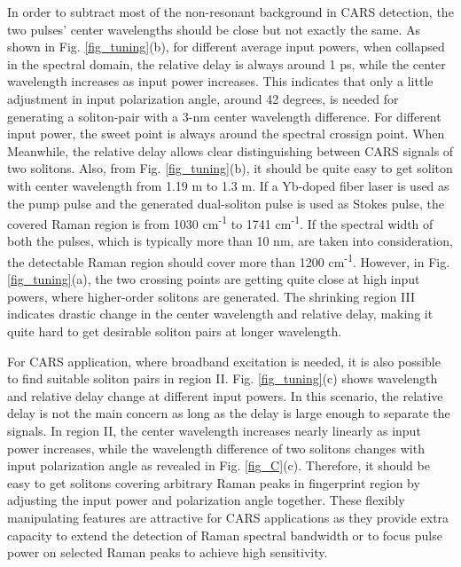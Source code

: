\documentclass{osa-article}
\begin{document}
In order to subtract most of the non-resonant background in CARS detection, the two pulses' center wavelengths should be close but not exactly the same\cite{rocha-mendoza_differential_2009}. As shown in Fig. \ref{fig_tuning}(b), for different average input powers, when collapsed in the spectral domain, the relative delay is always around 1 ps, while the center wavelength increases as input power increases. This indicates that only a little adjustment in input polarization angle, around 42 degrees, is needed for generating a soliton-pair with a 3-nm center wavelength difference. For different input power, the sweet point is always around the spectral crossign point. When Meanwhile, the relative delay allows clear distinguishing between CARS signals of two solitons. Also, from Fig. \ref{fig_tuning}(b), it should be quite easy to get soliton with center wavelength from 1.19 \textmu m to 1.3 \textmu m. If a Yb-doped fiber laser is used as the pump pulse and the generated dual-soliton pulse is used as Stokes pulse, the covered Raman region is from 1030 cm\textsuperscript{-1} to 1741 cm\textsuperscript{-1}. If the spectral width of both the pulses, which is typically more than 10 nm, are taken into consideration, the detectable Raman region should cover more than 1200 cm\textsuperscript{-1}. However, in Fig. \ref{fig_tuning}(a), the two crossing points are getting quite close at high input powers, where higher-order solitons are generated. The shrinking region III indicates drastic change in the center wavelength and relative delay, making it quite hard to get desirable soliton pairs at longer wavelength.

For CARS application, where broadband excitation is needed, it is also possible to find suitable soliton pairs in region II. Fig. \ref{fig_tuning}(c) shows wavelength and relative delay change at different input powers. In this scenario, the relative delay is not the main concern as long as the delay is large enough to separate the signals. In region II, the center wavelength increases nearly linearly as input power increases, while the wavelength difference of two solitons changes with input polarization angle as revealed in Fig. \ref{fig_C}(c). Therefore, it should be easy to get solitons covering arbitrary Raman peaks in fingerprint region by adjusting the input power and polarization angle together. These flexibly manipulating features are attractive for CARS applications as they provide extra capacity to extend the detection of Raman spectral bandwidth or to focus pulse power on selected Raman peaks to achieve high sensitivity.
\end{document}
